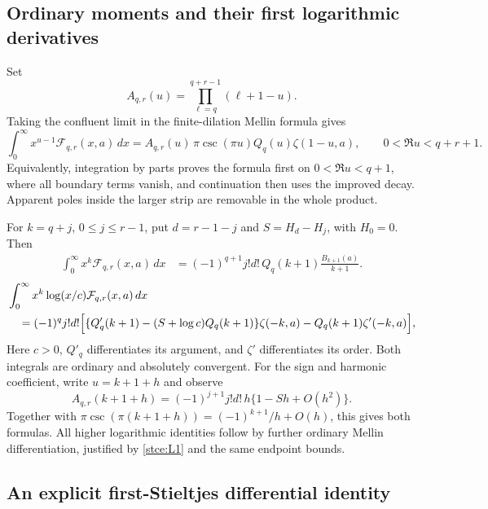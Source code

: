 \subsection{Ordinary moments and their first logarithmic derivatives}

Set
\[
 A_{q,r}(u)=\prod_{\ell=q}^{q+r-1}(\ell+1-u).
\]
Taking the confluent limit in the finite-dilation Mellin formula gives
\begin{equation}\label{stce:mellin}
 \int_0^\infty x^{u-1}\mathcal F_{q,r}(x,a)\,dx
 =A_{q,r}(u)\,\pi\csc(\pi u)Q_q(u)\zeta(1-u,a),
 \qquad 0<\Re u<q+r+1.
\end{equation}
Equivalently, integration by parts proves the formula first on
$0<\Re u<q+1$, where all boundary terms vanish, and continuation then
uses the improved decay.  Apparent poles inside the larger strip are
removable in the whole product.

For $k=q+j$, $0\le j\le r-1$, put $d=r-1-j$ and
$S=H_d-H_j$, with $H_0=0$.  Then
\begin{align}
 \int_0^\infty x^k\mathcal F_{q,r}(x,a)\,dx
 &=(-1)^{q+1}j!d!\,
      Q_q(k+1)\frac{B_{k+1}(a)}{k+1}.\label{stce:moment}
\end{align}
\begin{align}
 &\int_0^\infty x^k\log(x/c)\mathcal F_{q,r}(x,a)\,dx\notag\\
 &\quad=(-1)^qj!d!\Bigl[
     \{Q'_q(k+1)-(S+\log c)Q_q(k+1)\}\zeta(-k,a)
       -Q_q(k+1)\zeta'(-k,a)\Bigr],\label{stce:logmoment}
\end{align}
Here $c>0$, $Q'_q$ differentiates its argument, and $\zeta'$ differentiates its
order.  Both integrals are ordinary and absolutely convergent.
For the sign and harmonic coefficient, write $u=k+1+h$ and observe
\[
 A_{q,r}(k+1+h)
 =(-1)^{j+1}j!d!\,h\{1-Sh+O(h^2)\}.
\]
Together with $\pi\csc(\pi(k+1+h))=(-1)^{k+1}/h+O(h)$, this gives
both formulas.  All higher logarithmic identities follow by further
ordinary Mellin differentiation, justified by \eqref{stce:L1} and the
same endpoint bounds.

\subsection{An explicit first-Stieltjes differential identity}

